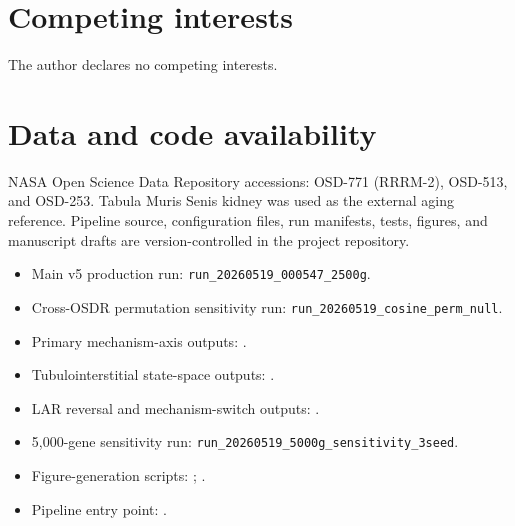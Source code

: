 \documentclass[11pt]{article}
\newcommand{\code}[1]{\texttt{#1}}
\begin{document}
\section*{Competing interests}
The author declares no competing interests.

\section*{Data and code availability}
NASA Open Science Data Repository accessions: OSD-771 (RRRM-2), OSD-513, and OSD-253. Tabula Muris Senis kidney was used as the external aging reference. Pipeline source, configuration files, run manifests, tests, figures, and manuscript drafts are version-controlled in the project repository.

\begin{itemize}
  \item Main v5 production run: \code{run\_20260519\_000547\_2500g}.
  \item Cross-OSDR permutation sensitivity run: \code{run\_20260519\_cosine\_perm\_null}.
  \item Primary mechanism-axis outputs: .
  \item Tubulointerstitial state-space outputs: .
  \item LAR reversal and mechanism-switch outputs: .
  \item 5,000-gene sensitivity run: \code{run\_20260519\_5000g\_sensitivity\_3seed}.
  \item Figure-generation scripts: ; .
  \item Pipeline entry point: .
\end{itemize}
\end{document}
